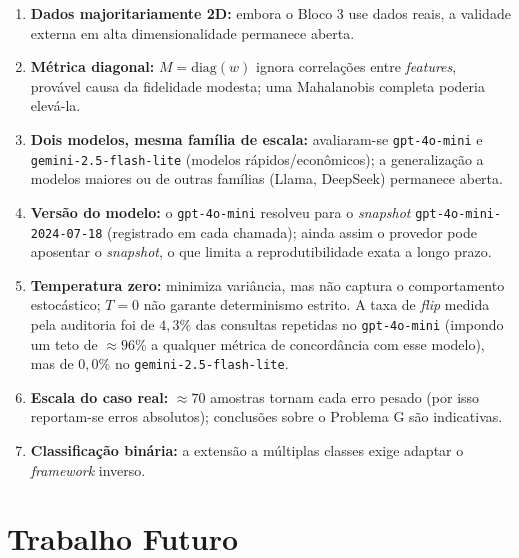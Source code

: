 \documentclass[12pt,a4paper]{article}
\begin{document}
\begin{enumerate}
  \item \textbf{Dados majoritariamente 2D:} embora o Bloco 3 use dados reais, a validade
    externa em alta dimensionalidade permanece aberta.
  \item \textbf{Métrica diagonal:} $M=\mathrm{diag}(w)$ ignora correlações entre
    \emph{features}, provável causa da fidelidade modesta; uma Mahalanobis completa poderia
    elevá-la.
  \item \textbf{Dois modelos, mesma família de escala:} avaliaram-se \texttt{gpt-4o-mini} e
    \texttt{gemini-2.5-flash-lite} (modelos rápidos/econômicos); a generalização a modelos
    maiores ou de outras famílias (Llama, DeepSeek) permanece aberta.
  \item \textbf{Versão do modelo:} o \texttt{gpt-4o-mini} resolveu para o \emph{snapshot}
    \texttt{gpt-4o-mini-2024-07-18} (registrado em cada chamada); ainda assim o provedor pode
    aposentar o \emph{snapshot}, o que limita a reprodutibilidade exata a longo prazo.
  \item \textbf{Temperatura zero:} minimiza variância, mas não captura o comportamento
    estocástico; $T=0$ não garante determinismo estrito. A taxa de \emph{flip} medida pela
    auditoria foi de $4{,}3\%$ das consultas repetidas no \texttt{gpt-4o-mini} (impondo um
    teto de $\approx 96\%$ a qualquer métrica de concordância com esse modelo), mas de
    $0{,}0\%$ no \texttt{gemini-2.5-flash-lite}.
  \item \textbf{Escala do caso real:} $\approx 70$ amostras tornam cada erro pesado (por
    isso reportam-se erros absolutos); conclusões sobre o Problema G são indicativas.
  \item \textbf{Classificação binária:} a extensão a múltiplas classes exige adaptar o
    \emph{framework} inverso.
\end{enumerate}

\section{Trabalho Futuro}
\label{sec:futuro}
\end{document}
